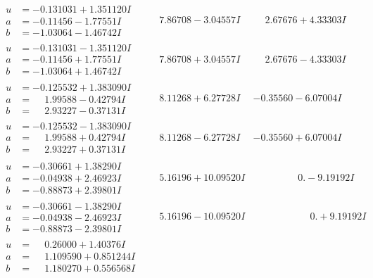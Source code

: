 \documentclass[1p]{elsarticle_modified}
\theoremstyle{definition}
\begin{document}
$$\begin{array}{c|c|c}
\begin{aligned}
u &= -0.131031 + 1.351120 I \\
a &= -0.11456 - 1.77551 I \\
b &= -1.03064 - 1.46742 I\end{aligned}
 & \phantom{-}7.86708 - 3.04557 I & \phantom{-}2.67676 + 4.33303 I \\ \hline\begin{aligned}
u &= -0.131031 - 1.351120 I \\
a &= -0.11456 + 1.77551 I \\
b &= -1.03064 + 1.46742 I\end{aligned}
 & \phantom{-}7.86708 + 3.04557 I & \phantom{-}2.67676 - 4.33303 I \\ \hline\begin{aligned}
u &= -0.125532 + 1.383090 I \\
a &= \phantom{-}1.99588 - 0.42794 I \\
b &= \phantom{-}2.93227 - 0.37131 I\end{aligned}
 & \phantom{-}8.11268 + 6.27728 I & -0.35560 - 6.07004 I \\ \hline\begin{aligned}
u &= -0.125532 - 1.383090 I \\
a &= \phantom{-}1.99588 + 0.42794 I \\
b &= \phantom{-}2.93227 + 0.37131 I\end{aligned}
 & \phantom{-}8.11268 - 6.27728 I & -0.35560 + 6.07004 I \\ \hline\begin{aligned}
u &= -0.30661 + 1.38290 I \\
a &= -0.04938 + 2.46923 I \\
b &= -0.88873 + 2.39801 I\end{aligned}
 & \phantom{-}5.16196 + 10.09520 I & \phantom{-0.000000 } 0. - 9.19192 I \\ \hline\begin{aligned}
u &= -0.30661 - 1.38290 I \\
a &= -0.04938 - 2.46923 I \\
b &= -0.88873 - 2.39801 I\end{aligned}
 & \phantom{-}5.16196 - 10.09520 I & \phantom{-0.000000 -}0. + 9.19192 I \\ \hline\begin{aligned}
u &= \phantom{-}0.26000 + 1.40376 I \\
a &= \phantom{-}1.109590 + 0.851244 I \\
b &= \phantom{-}1.180270 + 0.556568 I\end{aligned}

\end{array}$$
\end{document}
